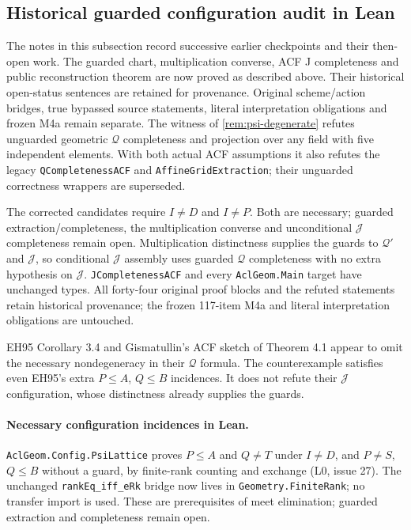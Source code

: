 \documentclass[11pt,oneside]{article}
\theoremstyle{definition}
\theoremstyle{remark}
\newcommand{\Qrel}{\mathcal{Q}}
\newcommand{\Qprel}{\mathcal{Q}'}
\newcommand{\Jrel}{\mathcal{J}}
\newcommand{\lean}[1]{\nolinkurl{#1}}
\begin{document}
\subsection{Historical guarded configuration audit in Lean}
The notes in this subsection record successive earlier checkpoints and their then-open
work.  The guarded chart, multiplication converse, ACF J completeness and public
reconstruction theorem are now proved as described above.  Their historical open-status
sentences are retained for provenance.  Original scheme/action bridges, true bypassed
source statements, literal interpretation obligations and frozen M4a remain separate.
The witness of \cref{rem:psi-degenerate} refutes unguarded geometric $\Qrel$
completeness and projection over any field with five independent elements.  With
both actual ACF assumptions it also refutes the legacy \lean{QCompletenessACF}
and \lean{AffineGridExtraction}; their unguarded correctness wrappers are superseded.

The corrected candidates require $I\ne D$ and $I\ne P$.  Both are necessary;
guarded extraction/completeness, the multiplication converse and unconditional
$\Jrel$ completeness remain open.  Multiplication distinctness supplies the
guards to $\Qprel$ and $\Jrel$, so conditional $\Jrel$ assembly uses guarded
$\Qrel$ completeness with no extra hypothesis on $\Jrel$.
\lean{JCompletenessACF} and every \lean{AclGeom.Main} target have unchanged types.
All forty-four original proof blocks and the refuted statements retain historical
provenance; the frozen 117-item M4a and literal interpretation obligations are untouched.

EH95 Corollary 3.4 and Gismatullin's ACF sketch of Theorem 4.1 appear to omit the
necessary nondegeneracy in their $\Qrel$ formula.  The counterexample satisfies even
EH95's extra $P\leq A$, $Q\leq B$ incidences.  It does not refute their $\Jrel$
configuration, whose distinctness already supplies the guards.

\paragraph{Necessary configuration incidences in Lean.}
\lean{AclGeom.Config.PsiLattice} proves $P\le A$ and $Q\ne T$ under $I\ne D$,
and $P\ne S$, $Q\le B$ without a guard, by finite-rank counting and exchange
(L0, issue 27).  The unchanged \lean{rankEq_iff_eRk} bridge now lives in
\lean{Geometry.FiniteRank}; no transfer import is used.  These are prerequisites
of meet elimination; guarded extraction and completeness remain open.
\end{document}
